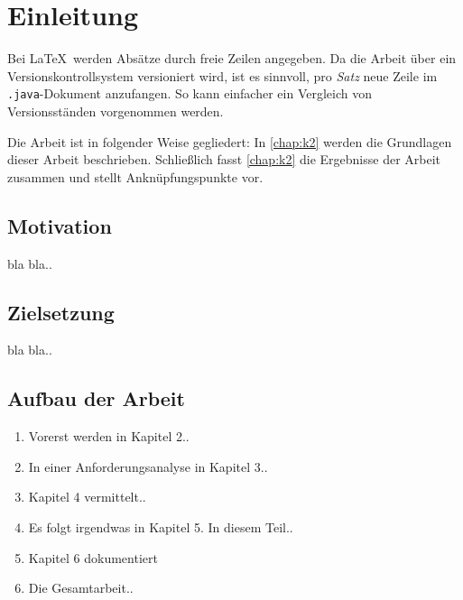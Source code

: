 \chapter{Einleitung}
\label{chap:k1}

Bei \LaTeX\ werden Absätze durch freie Zeilen angegeben.
Da die Arbeit über ein Versionskontrollsystem versioniert wird, ist es sinnvoll, pro \emph{Satz} neue Zeile im \texttt{.java}-Dokument anzufangen.
So kann einfacher ein Vergleich von Versionsständen vorgenommen werden.

Die Arbeit ist in folgender Weise gegliedert:
In \cref{chap:k2} werden die Grundlagen dieser Arbeit beschrieben.
Schließlich fasst \cref{chap:k2} die Ergebnisse der Arbeit zusammen und stellt Anknüpfungspunkte vor.

\section{Motivation}

bla bla..


\section{Zielsetzung}

bla bla..


\section{Aufbau der Arbeit}

\begin{enumerate}
\item Vorerst werden in Kapitel 2..
\item In einer Anforderungsanalyse in Kapitel 3..
\item Kapitel 4 vermittelt..
\item Es folgt irgendwas in Kapitel 5. In diesem Teil..
\item Kapitel 6 dokumentiert
\item Die Gesamtarbeit..
\end{enumerate}

